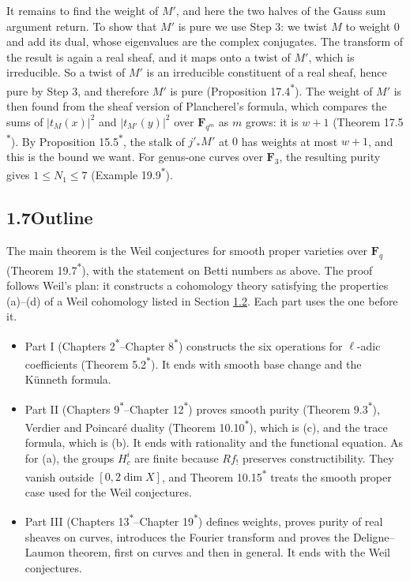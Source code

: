 \documentclass[11pt]{article}
\newcommand{\bpout}[1]{#1\textsuperscript{\hyperlink{bp-outside}{\ensuremath{\ast}}}}
\begin{document}
It remains to find the weight of \(M'\), and here the two halves of the Gauss sum argument return. To show that \(M'\) is pure we use Step 3: we twist \(M\) to weight \(0\) and add its dual, whose eigenvalues are the complex conjugates. The transform of the result is again a real sheaf, and it maps onto a twist of \(M'\), which is irreducible. So a twist of \(M'\) is an irreducible constituent of a real sheaf, hence pure by Step 3, and therefore \(M'\) is pure (Proposition \bpout{17.4}). The weight of \(M'\) is then found from the sheaf version of Plancherel's formula, which compares the sums of \(|t_M(x)|^2\) and \(|t_{M'}(y)|^2\) over \(\mathbf F_{q^m}\) as \(m\) grows: it is \(w+1\) (Theorem \bpout{17.5}). By Proposition \bpout{15.5}, the stalk of \(j'_*M'\) at \(0\) has weights at most \(w+1\), and this is the bound we want. For genus-one curves over \(\mathbf F_3\), the resulting purity gives \(1\le N_1\le7\) (Example \bpout{19.9}).


\subsection*{\texorpdfstring{1.7\quad Outline}{1.7 Outline}}
\label{bp15}%
\label{bp16}%
The main theorem is the Weil conjectures for smooth proper varieties over \(\mathbf F_q\) (Theorem \bpout{19.7}), with the statement on Betti numbers as above. The proof follows Weil's plan: it constructs a cohomology theory satisfying the properties (a)–(d) of a Weil cohomology listed in Section \hyperref[bp5]{1.2}. Each part uses the one before it.

\begin{itemize}
\item Part I (Chapters \bpout{2}–\bpout{Chapter 8}) constructs the six operations for \(\ell\)-adic coefficients (Theorem \bpout{5.2}). It ends with smooth base change and the Künneth formula.
\item Part II (Chapters \bpout{9}–\bpout{Chapter 12}) proves smooth purity (Theorem \bpout{9.3}), Verdier and Poincaré duality (Theorem \bpout{10.10}), which is (c), and the trace formula, which is (b). It ends with rationality and the functional equation. As for (a), the groups \(H^i_c\) are finite because \(Rf_!\) preserves constructibility. They vanish outside \([0,2\dim X]\), and Theorem \bpout{10.15} treats the smooth proper case used for the Weil conjectures.
\item Part III (Chapters \bpout{13}–\bpout{Chapter 19}) defines weights, proves purity of real sheaves on curves, introduces the Fourier transform and proves the Deligne–Laumon theorem, first on curves and then in general. It ends with the Weil conjectures.
\end{itemize}
\end{document}
